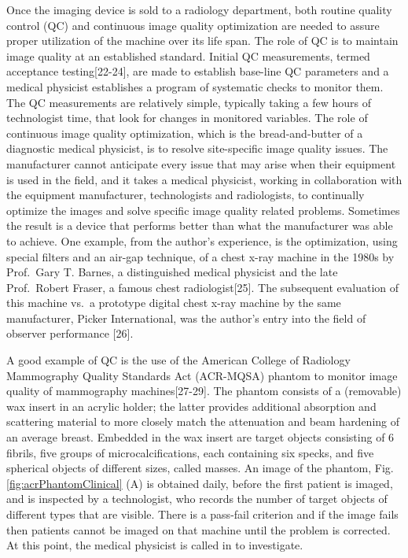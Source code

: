 \documentclass[
]{book}
\begin{document}
Once the imaging device is sold to a radiology department, both routine quality control (QC) and continuous image quality optimization are needed to assure proper utilization of the machine over its life span. The role of QC is to maintain image quality at an established standard. Initial QC measurements, termed acceptance testing{[}22-24{]}, are made to establish base-line QC parameters and a medical physicist establishes a program of systematic checks to monitor them. The QC measurements are relatively simple, typically taking a few hours of technologist time, that look for changes in monitored variables. The role of continuous image quality optimization, which is the bread-and-butter of a diagnostic medical physicist, is to resolve site-specific image quality issues. The manufacturer cannot anticipate every issue that may arise when their equipment is used in the field, and it takes a medical physicist, working in collaboration with the equipment manufacturer, technologists and radiologists, to continually optimize the images and solve specific image quality related problems. Sometimes the result is a device that performs better than what the manufacturer was able to achieve. One example, from the author's experience, is the optimization, using special filters and an air-gap technique, of a chest x-ray machine in the 1980s by Prof.~Gary T. Barnes, a distinguished medical physicist and the late Prof.~Robert Fraser, a famous chest radiologist{[}25{]}. The subsequent evaluation of this machine vs.~a prototype digital chest x-ray machine by the same manufacturer, Picker International, was the author's entry into the field of observer performance {[}26{]}.

A good example of QC is the use of the American College of Radiology Mammography Quality Standards Act (ACR-MQSA) phantom to monitor image quality of mammography machines{[}27-29{]}. The phantom consists of a (removable) wax insert in an acrylic holder; the latter provides additional absorption and scattering material to more closely match the attenuation and beam hardening of an average breast. Embedded in the wax insert are target objects consisting of 6 fibrils, five groups of microcalcifications, each containing six specks, and five spherical objects of different sizes, called masses. An image of the phantom, Fig. \ref{fig:acrPhantomClinical} (A) is obtained daily, before the first patient is imaged, and is inspected by a technologist, who records the number of target objects of different types that are visible. There is a pass-fail criterion and if the image fails then patients cannot be imaged on that machine until the problem is corrected. At this point, the medical physicist is called in to investigate.
\end{document}
